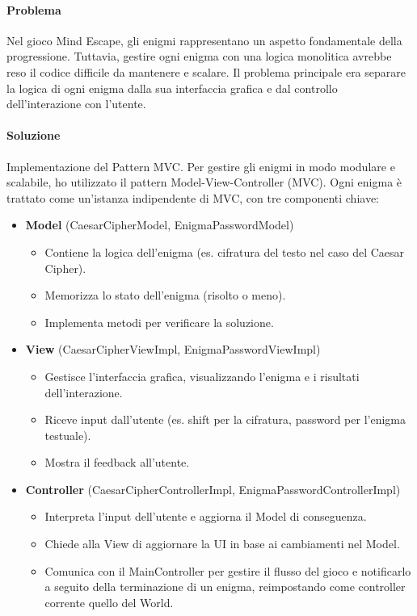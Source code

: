 \documentclass[a4paper,12pt]{report}
\begin{document}
\paragraph{Problema} %
Nel gioco Mind Escape, gli enigmi rappresentano un aspetto fondamentale della progressione. Tuttavia, gestire ogni enigma con una logica monolitica avrebbe reso il codice difficile da mantenere e scalare. Il problema principale era separare la logica di ogni enigma dalla sua interfaccia grafica e dal controllo dell’interazione con l’utente.
\paragraph{Soluzione} %
Implementazione del Pattern MVC.
Per gestire gli enigmi in modo modulare e scalabile, ho utilizzato il pattern Model-View-Controller (MVC). Ogni enigma è trattato come un'istanza indipendente di MVC, con tre componenti chiave:
\begin{itemize}
	\item \textbf{Model} (CaesarCipherModel, EnigmaPasswordModel)
		\begin{itemize}
			\item Contiene la logica dell’enigma (es. cifratura del testo nel caso del Caesar Cipher).
			\item Memorizza lo stato dell’enigma (risolto o meno).
			\item Implementa metodi per verificare la soluzione.
		\end{itemize}
	\item \textbf{View} (CaesarCipherViewImpl, EnigmaPasswordViewImpl)
		\begin{itemize}
			\item Gestisce l’interfaccia grafica, visualizzando l’enigma e i risultati dell’interazione.
			\item Riceve input dall’utente (es. shift per la cifratura, password per l’enigma testuale).
			\item Mostra il feedback all’utente.
		\end{itemize}
	\item \textbf{Controller} (CaesarCipherControllerImpl, EnigmaPasswordControllerImpl)
		\begin{itemize}
			\item Interpreta l’input dell’utente e aggiorna il Model di conseguenza.
			\item Chiede alla View di aggiornare la UI in base ai cambiamenti nel Model.
			\item Comunica con il MainController per gestire il flusso del gioco e notificarlo a seguito della terminazione di un enigma, reimpostando come controller corrente quello del World.
		\end{itemize}
\end{itemize}
\end{document}
